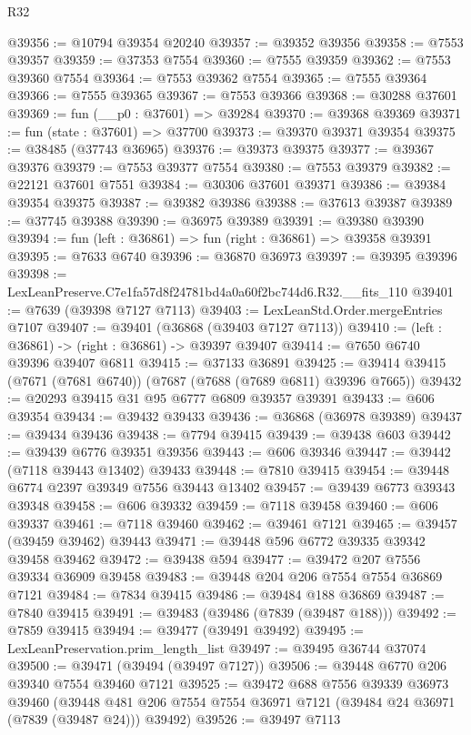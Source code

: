 \begin{lexlean}{R32}
\begin{coremodule}
@39356 := @10794 @39354 @20240
@39357 := @39352 @39356
@39358 := @7553 @39357
@39359 := @37353 @7554
@39360 := @7555 @39359
@39362 := @7553 @39360 @7554
@39364 := @7553 @39362 @7554
@39365 := @7555 @39364
@39366 := @7555 @39365
@39367 := @7553 @39366
@39368 := @30288 @37601
@39369 := fun (__p0 : @37601) => @39284
@39370 := @39368 @39369
@39371 := fun (state : @37601) => @37700
@39373 := @39370 @39371 @39354
@39375 := @38485 (@37743 @36965)
@39376 := @39373 @39375
@39377 := @39367 @39376
@39379 := @7553 @39377 @7554
@39380 := @7553 @39379
@39382 := @22121 @37601 @7551
@39384 := @30306 @37601 @39371
@39386 := @39384 @39354 @39375
@39387 := @39382 @39386
@39388 := @37613 @39387
@39389 := @37745 @39388
@39390 := @36975 @39389
@39391 := @39380 @39390
@39394 := fun (left : @36861) => fun (right : @36861) => @39358 @39391
@39395 := @7633 @6740
@39396 := @36870 @36973
@39397 := @39395 @39396
@39398 := LexLeanPreserve.C7e1fa57d8f24781bd4a0a60f2bc744d6.R32.__fits_110
@39401 := @7639 (@39398 @7127 @7113)
@39403 := LexLeanStd.Order.mergeEntries @7107
@39407 := @39401 (@36868 (@39403 @7127 @7113))
@39410 := (left : @36861) -> (right : @36861) -> @39397 @39407
@39414 := @7650 @6740 @39396 @39407 @6811
@39415 := @37133 @36891
@39425 := @39414 @39415 (@7671 (@7681 @6740)) (@7687 (@7688 (@7689 @6811) @39396 @7665))
@39432 := @20293 @39415 @31 @95 @6777 @6809 @39357 @39391
@39433 := @606 @39354
@39434 := @39432 @39433
@39436 := @36868 (@36978 @39389)
@39437 := @39434 @39436
@39438 := @7794 @39415
@39439 := @39438 @603
@39442 := @39439 @6776 @39351 @39356
@39443 := @606 @39346
@39447 := @39442 (@7118 @39443 @13402) @39433
@39448 := @7810 @39415
@39454 := @39448 @6774 @2397 @39349 @7556 @39443 @13402
@39457 := @39439 @6773 @39343 @39348
@39458 := @606 @39332
@39459 := @7118 @39458
@39460 := @606 @39337
@39461 := @7118 @39460
@39462 := @39461 @7121
@39465 := @39457 (@39459 @39462) @39443
@39471 := @39448 @596 @6772 @39335 @39342 @39458 @39462
@39472 := @39438 @594
@39477 := @39472 @207 @7556 @39334 @36909 @39458
@39483 := @39448 @204 @206 @7554 @7554 @36869 @7121
@39484 := @7834 @39415
@39486 := @39484 @188 @36869
@39487 := @7840 @39415
@39491 := @39483 (@39486 (@7839 (@39487 @188)))
@39492 := @7859 @39415
@39494 := @39477 (@39491 @39492)
@39495 := LexLeanPreservation.prim_length_list
@39497 := @39495 @36744 @37074
@39500 := @39471 (@39494 (@39497 @7127))
@39506 := @39448 @6770 @206 @39340 @7554 @39460 @7121
@39525 := @39472
    @688
    @7556
    @39339
    @36973
    @39460
    (@39448 @481 @206 @7554 @7554 @36971 @7121 (@39484 @24 @36971 (@7839 (@39487 @24))) @39492)
@39526 := @39497 @7113

\end{coremodule}
\end{lexlean}
